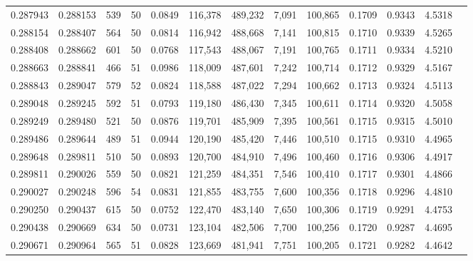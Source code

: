 \begin{tabular}{rrrrrrrrrrrrr}
0.287943 & 0.288153 &   539 &  50 &                                     0.0849 & 116,378 & 489,232 &   7,091 & 100,865 & 0.1709 & 0.9343 & 4.5318 \\
0.288154 & 0.288407 &   564 &  50 &                                     0.0814 & 116,942 & 488,668 &   7,141 & 100,815 & 0.1710 & 0.9339 & 4.5265 \\
0.288408 & 0.288662 &   601 &  50 &                                     0.0768 & 117,543 & 488,067 &   7,191 & 100,765 & 0.1711 & 0.9334 & 4.5210 \\
0.288663 & 0.288841 &   466 &  51 &                                     0.0986 & 118,009 & 487,601 &   7,242 & 100,714 & 0.1712 & 0.9329 & 4.5167 \\
0.288843 & 0.289047 &   579 &  52 &                                     0.0824 & 118,588 & 487,022 &   7,294 & 100,662 & 0.1713 & 0.9324 & 4.5113 \\
0.289048 & 0.289245 &   592 &  51 &                                     0.0793 & 119,180 & 486,430 &   7,345 & 100,611 & 0.1714 & 0.9320 & 4.5058 \\
0.289249 & 0.289480 &   521 &  50 &                                     0.0876 & 119,701 & 485,909 &   7,395 & 100,561 & 0.1715 & 0.9315 & 4.5010 \\
0.289486 & 0.289644 &   489 &  51 &                                     0.0944 & 120,190 & 485,420 &   7,446 & 100,510 & 0.1715 & 0.9310 & 4.4965 \\
0.289648 & 0.289811 &   510 &  50 &                                     0.0893 & 120,700 & 484,910 &   7,496 & 100,460 & 0.1716 & 0.9306 & 4.4917 \\
0.289811 & 0.290026 &   559 &  50 &                                     0.0821 & 121,259 & 484,351 &   7,546 & 100,410 & 0.1717 & 0.9301 & 4.4866 \\
0.290027 & 0.290248 &   596 &  54 &                                     0.0831 & 121,855 & 483,755 &   7,600 & 100,356 & 0.1718 & 0.9296 & 4.4810 \\
0.290250 & 0.290437 &   615 &  50 &                                     0.0752 & 122,470 & 483,140 &   7,650 & 100,306 & 0.1719 & 0.9291 & 4.4753 \\
0.290438 & 0.290669 &   634 &  50 &                                     0.0731 & 123,104 & 482,506 &   7,700 & 100,256 & 0.1720 & 0.9287 & 4.4695 \\
0.290671 & 0.290964 &   565 &  51 &                                     0.0828 & 123,669 & 481,941 &   7,751 & 100,205 & 0.1721 & 0.9282 & 4.4642 \\

\end{tabular}
